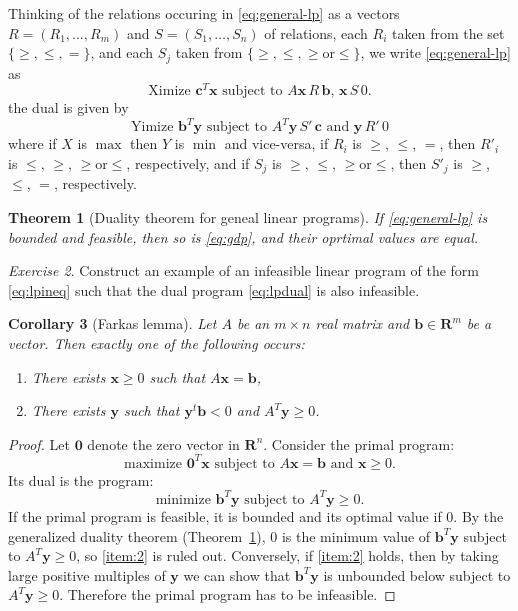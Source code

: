 \documentclass{amsbook}
\newcommand{\xx}{\mathbf x}
\newcommand{\yy}{\mathbf y}
\newcommand{\cc}{\mathbf c}
\newcommand{\bb}{\mathbf b}
\newcommand{\RR}{\mathbf R}
\newtheorem{theorem}{Theorem}[section]
\newtheorem{corollary}[theorem]{Corollary}
\theoremstyle{definition}
\theoremstyle{remark}
\newtheorem{exercise}[theorem]{Exercise}
\begin{document}
Thinking of the relations occuring in \eqref{eq:general-lp} as a vectors $R=(R_1,\dotsc,R_m)$ and $S=(S_1,\dotsc,S_n)$ of relations, each $R_i$ taken from the set $\{\geq,\leq,=\}$, and each $S_j$ taken from $\{\geq,\leq,\geq\text{or}\leq\}$, we write \eqref{eq:general-lp} as
\begin{equation}
  \tag{GLP}
  \text{Ximize $\cc^T\xx$ subject to $A\xx \,R\, \bb$, $\xx \,S\,0$}.
\end{equation}
the dual is given by
\begin{equation}
  \label{eq:gdp}
  \tag{GDP}
  \text{Yimize $\bb^T\yy$ subject to $A^T\yy\, S'\, \cc$ and $\yy\, R'\, 0$}
\end{equation}
where if $X$ is $\max$ then $Y$ is $\min$ and vice-versa, if $R_i$ is $\geq$, $\leq$, $=$, then $R'_i$ is $\leq$, $\geq$, $\geq\text{or}\leq$, respectively, and if $S_j$ is $\geq$, $\leq$, $\geq\text{or}\leq$, then $S'_j$ is $\geq$, $\leq$, $=$, respectively.
\begin{theorem}
  [Duality theorem for geneal linear programs]
  \label{theorem:gen-dual}
  If \eqref{eq:general-lp} is bounded and feasible, then so is \eqref{eq:gdp}, and their oprtimal values are equal.
\end{theorem}
\begin{exercise}
  Construct an example of an infeasible linear program of the form \eqref{eq:lpineq} such that the dual program \eqref{eq:lpdual} is also infeasible.
\end{exercise}
\begin{corollary}
  [Farkas lemma]
  Let $A$ be an $m\times n$ real matrix and $\bb\in \RR^m$ be a vector.
  Then exactly one of the following occurs:
  \begin{enumerate}
  \item \label{item:1} There exists $\xx\geq 0$ such that $A\xx=\bb$,
  \item \label{item:2} There exists $\yy$ such that $\yy^t\bb<0$ and $A^T\yy\geq 0$.
  \end{enumerate}
\end{corollary}
\begin{proof}
  Let $\mathbf 0$ denote the zero vector in $\RR^n$.
  Consider the primal program:
  \begin{displaymath}
    \text{maximize $\mathbf 0^T\xx$ subject to $A\xx=\bb$ and $\xx\geq 0$}.
  \end{displaymath}
  Its dual is the program:
  \begin{displaymath}
    \text{minimize $\bb^T\yy$ subject to $A^T\yy\geq 0$.}
  \end{displaymath}
  If the primal program is feasible, it is bounded and its optimal value if $0$.
  By the generalized duality theorem (Theorem~\ref{theorem:gen-dual}), $0$ is the minimum value of $\bb^T\yy$ subject to $A^T\yy\geq 0$, so \eqref{item:2} is ruled out.
  Conversely, if \eqref{item:2} holds, then by taking large positive multiples of $\yy$ we can show that $\bb^T\yy$ is unbounded below subject to $A^T\yy\geq 0$.
  Therefore the primal program has to be infeasible.
\end{proof}
\end{document}
